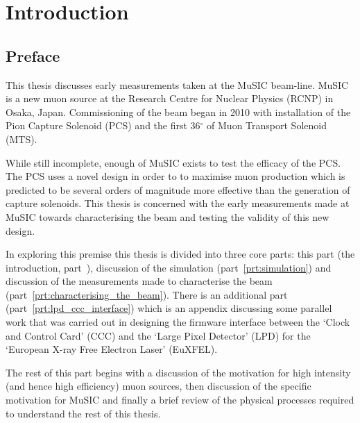 \part{Introduction} %
\label{prt:introduction}
\chapter{Preface} %
\label{cha:preface}
This thesis discusses early measurements taken at the MuSIC beam-line. MuSIC is a new muon source at the Research Centre for Nuclear Physics (RCNP) in Osaka, Japan. Commissioning of the beam began in 2010 with installation of the Pion Capture Solenoid (PCS) and the first 36\(^{\circ}\) of Muon Transport Solenoid (MTS).

While still incomplete, enough of MuSIC exists to test the efficacy of the PCS. The PCS uses a novel design in order to to maximise muon production which is predicted to be several orders of magnitude more effective than the generation of capture solenoids. This thesis is concerned with the early measurements made at MuSIC towards characterising the beam and testing the validity of this new design.

In exploring this premise this thesis is divided into three core parts: this part (the introduction, part~\ref{prt:introduction}), discussion of the simulation (part~\ref{prt:simulation}) and discussion of the measurements made to characterise the beam (part~\ref{prt:characterising_the_beam}). There is an additional part (part~\ref{prt:lpd_ccc_interface}) which is an appendix discussing some parallel work that was carried out in designing the firmware interface between the `Clock and Control Card' (CCC) and the `Large Pixel Detector' (LPD) for the `European X-ray Free Electron Laser' (EuXFEL).

The rest of this part begins with a discussion of the motivation for high intensity (and hence high efficiency) muon sources, then discussion of the specific motivation for MuSIC and finally a brief review of the physical processes required to understand the rest of this thesis.

